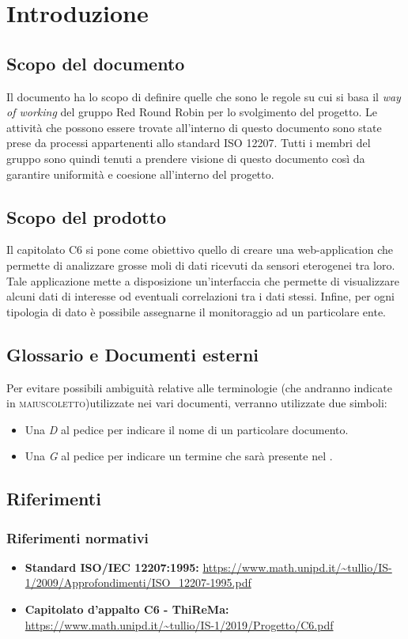 \section{Introduzione}
	\subsection{Scopo del documento}
		Il documento ha lo scopo di definire quelle che sono le regole su cui si basa il \textit{way of working} del gruppo Red Round Robin per lo svolgimento del progetto. Le attività che possono essere trovate all'interno di questo documento sono state prese da processi appartenenti allo standard ISO 12207. Tutti i membri del gruppo sono quindi tenuti a prendere visione di questo documento così da garantire uniformità e coesione all'interno del progetto.   
	\subsection{Scopo del prodotto}
		Il capitolato C6 si pone come obiettivo quello di creare una web-application che permette di analizzare grosse moli di dati ricevuti da sensori eterogenei tra loro. Tale applicazione mette a disposizione un'interfaccia che permette di visualizzare alcuni dati di interesse od eventuali correlazioni tra i dati stessi. Infine, per ogni tipologia di dato è possibile assegnarne il monitoraggio ad un particolare ente. 
	\subsection{Glossario e Documenti esterni}
		Per evitare possibili ambiguità relative alle terminologie (che andranno indicate in \textsc{maiuscoletto})utilizzate nei vari documenti, verranno utilizzate due simboli:
		\begin{itemize}
			\item Una \textit{D} al pedice per indicare il nome di un particolare documento.
			\item Una \textit{G} al pedice per indicare un termine che sarà 
			presente nel .
		\end{itemize}
	\subsection{Riferimenti}

		\subsubsection{Riferimenti normativi}
			\begin{itemize}
				\item \textbf{Standard ISO/IEC 12207:1995: } 
				\url{https://www.math.unipd.it/~tullio/IS-1/2009/Approfondimenti/ISO_12207-1995.pdf}
				\item \textbf{Capitolato d'appalto C6 - ThiReMa: } 
				\url{https://www.math.unipd.it/~tullio/IS-1/2019/Progetto/C6.pdf}
			\end{itemize}	
